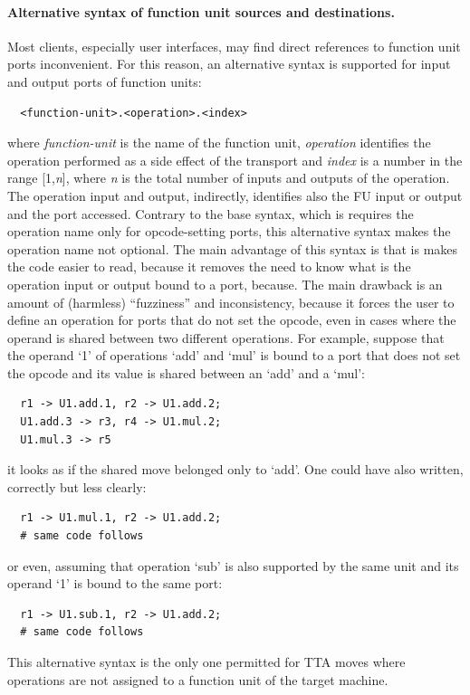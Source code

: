 \documentclass[a4paper,twoside]{tceusermanual}
\begin{document}
\paragraph{Alternative syntax of function unit sources and destinations.}
Most clients, especially user interfaces, may find direct references to
function unit ports inconvenient. For this reason, an alternative syntax is
supported for input and output ports of function units:
\begin{verbatim}
  <function-unit>.<operation>.<index>
\end{verbatim}
where \emph{function-unit} is the name of the function unit,
\emph{operation} identifies the operation performed as a side effect of the
transport and \emph{index} is a number in the range [1,\emph{n}], where
\emph{n} is the total number of inputs and outputs of the operation.
%
The operation input and output, indirectly, identifies also the FU input or
output and the port accessed.  Contrary to the base syntax, which is
requires the operation name only for opcode-setting ports, this alternative
syntax makes the operation name not optional.
%
The main advantage of this syntax is that is makes the code easier to read,
because it removes the need to know what is the operation input or output
bound to a port, because.  The main drawback is an amount of (harmless)
``fuzziness'' and inconsistency, because it forces the user to define an
operation for ports that do not set the opcode, even in cases where the
operand is shared between two different operations.  For example, suppose
that the operand `1' of operations `add' and `mul' is bound to a port that
does not set the opcode and its value is shared between an `add' and a
`mul':
\begin{verbatim}
  r1 -> U1.add.1, r2 -> U1.add.2;
  U1.add.3 -> r3, r4 -> U1.mul.2;
  U1.mul.3 -> r5
\end{verbatim}
it looks as if the shared move belonged only to `add'. One could have also
written, correctly but less clearly:
\begin{verbatim}
  r1 -> U1.mul.1, r2 -> U1.add.2;
  # same code follows
\end{verbatim}
or even, assuming that operation `sub' is also supported by the same unit
and its operand `1' is bound to the same port:
\begin{verbatim}
  r1 -> U1.sub.1, r2 -> U1.add.2;
  # same code follows
\end{verbatim}

This alternative syntax is the only one permitted for TTA moves where
operations are not assigned to a function unit of the target machine.
\end{document}

